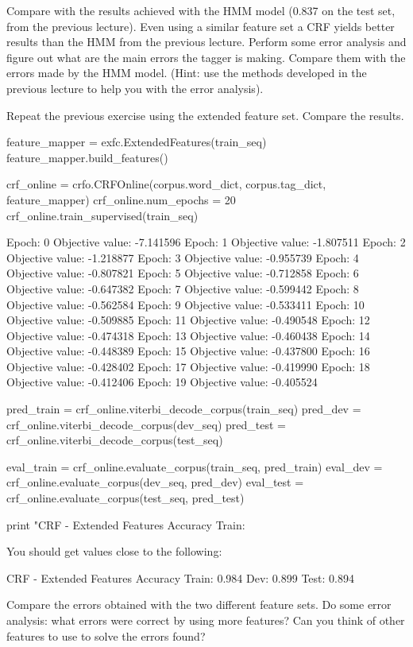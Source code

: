 Compare with the results achieved with the HMM model (0.837 on the test set, from the previous lecture). Even using a similar feature set a CRF yields better
results than the HMM from the previous lecture. 
Perform some error analysis and figure out what are the main
errors the tagger is making. Compare them with the errors made
by the HMM model. (Hint: use the methods developed in the previous
lecture to help you with the error analysis).


\begin{exercise}\label{exer:crf2}
Repeat the previous exercise using the extended feature set. Compare the results.

\begin{python}
feature_mapper = exfc.ExtendedFeatures(train_seq)
feature_mapper.build_features()

crf_online = crfo.CRFOnline(corpus.word_dict, corpus.tag_dict, feature_mapper)
crf_online.num_epochs = 20
crf_online.train_supervised(train_seq)

Epoch: 0 Objective value: -7.141596
Epoch: 1 Objective value: -1.807511
Epoch: 2 Objective value: -1.218877
Epoch: 3 Objective value: -0.955739
Epoch: 4 Objective value: -0.807821
Epoch: 5 Objective value: -0.712858
Epoch: 6 Objective value: -0.647382
Epoch: 7 Objective value: -0.599442
Epoch: 8 Objective value: -0.562584
Epoch: 9 Objective value: -0.533411
Epoch: 10 Objective value: -0.509885
Epoch: 11 Objective value: -0.490548
Epoch: 12 Objective value: -0.474318
Epoch: 13 Objective value: -0.460438
Epoch: 14 Objective value: -0.448389
Epoch: 15 Objective value: -0.437800
Epoch: 16 Objective value: -0.428402
Epoch: 17 Objective value: -0.419990
Epoch: 18 Objective value: -0.412406
Epoch: 19 Objective value: -0.405524

pred_train = crf_online.viterbi_decode_corpus(train_seq)
pred_dev = crf_online.viterbi_decode_corpus(dev_seq)
pred_test = crf_online.viterbi_decode_corpus(test_seq)

eval_train = crf_online.evaluate_corpus(train_seq, pred_train)
eval_dev = crf_online.evaluate_corpus(dev_seq, pred_dev)
eval_test = crf_online.evaluate_corpus(test_seq, pred_test)

print "CRF - Extended Features Accuracy Train: %
\end{python}

You should get values close to the following:
\begin{python}
CRF - Extended Features Accuracy Train: 0.984 Dev: 0.899 Test: 0.894
\end{python}


Compare the errors obtained with the two different feature
sets. Do some error analysis: what errors were correct by using
more features? Can you think of other features to use to solve the
errors found?
\end{exercise}

